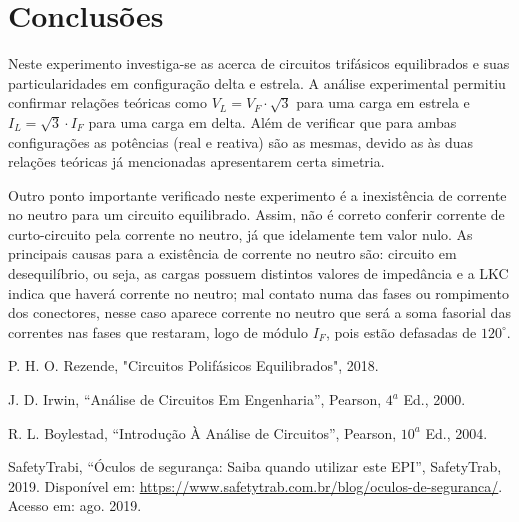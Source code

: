 \documentclass[a4paper,12pt,oneside,openany,table,xcdraw]{article}
\begin{document}
\section{Conclusões} %
Neste experimento investiga-se as acerca de circuitos trifásicos equilibrados e suas particularidades em configuração delta e estrela. A análise experimental permitiu confirmar relações teóricas como $V_L=V_F\cdot\sqrt{3}$ para uma carga em estrela e $I_L = \sqrt{3}\cdot I_F$ para uma carga em delta. Além de verificar que para ambas configurações as potências (real e reativa) são as mesmas, devido as às duas relações teóricas já mencionadas apresentarem certa simetria.

Outro ponto importante verificado neste experimento é a inexistência de corrente no neutro para um circuito equilibrado. Assim, não é correto conferir corrente de curto-circuito pela corrente no neutro, já que idelamente tem valor nulo. As principais causas para a existência de corrente no neutro são: circuito em desequilíbrio, ou seja, as cargas possuem distintos valores de impedância e a LKC indica que haverá corrente no neutro; mal contato numa das fases ou rompimento dos conectores, nesse caso aparece corrente no neutro que será a soma fasorial das correntes nas fases que restaram, logo de módulo $I_F$, pois estão defasadas de $120^\circ$.  

\newpage
\begin{thebibliography}{9} 
    P. H. O. Rezende,
    "Circuitos Polifásicos Equilibrados", 2018.

    J. D. Irwin,
    “Análise de Circuitos Em Engenharia”, Pearson, $4^a$ Ed., 2000.

    R. L. Boylestad,
    “Introdução À Análise de Circuitos”, Pearson, $10^a$ Ed., 2004.

    SafetyTrabi,
    “Óculos de segurança: Saiba quando utilizar este EPI”, SafetyTrab, 2019.
 Disponível em:
 \url{https://www.safetytrab.com.br/blog/oculos-de-seguranca/}. Acesso em: ago. 2019.


\end{thebibliography}
\end{document}
